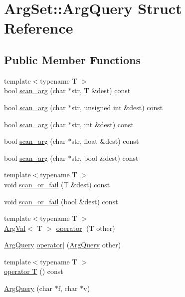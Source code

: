 \hypertarget{structArgSet_1_1ArgQuery}{\section{Arg\-Set\-:\-:Arg\-Query Struct Reference}
\label{structArgSet_1_1ArgQuery}
}
\subsection*{Public Member Functions}
\begin{DoxyCompactItemize}
\item 
{\footnotesize template$<$typename T $>$ }\\bool \hyperlink{structArgSet_1_1ArgQuery_ad1c8565789000799d89399357b3b7a8e}{scan\-\_\-arg} (char $\ast$str, T \&dest) const 
\item 
bool \hyperlink{structArgSet_1_1ArgQuery_acc5c6a294a3794ce1647fa540fde7af3}{scan\-\_\-arg} (char $\ast$str, unsigned int \&dest) const 
\item 
bool \hyperlink{structArgSet_1_1ArgQuery_aac1f8ec16ff67d1673b8a5bb6751d078}{scan\-\_\-arg} (char $\ast$str, int \&dest) const 
\item 
bool \hyperlink{structArgSet_1_1ArgQuery_a3235cfbd530a335ac3a0c0940623a185}{scan\-\_\-arg} (char $\ast$str, float \&dest) const 
\item 
bool \hyperlink{structArgSet_1_1ArgQuery_a26b2fad81bbc920f694522da48e903aa}{scan\-\_\-arg} (char $\ast$str, bool \&dest) const 
\item 
{\footnotesize template$<$typename T $>$ }\\void \hyperlink{structArgSet_1_1ArgQuery_a304f5268a939613e5616c6c8047c5eeb}{scan\-\_\-or\-\_\-fail} (T \&dest) const 
\item 
void \hyperlink{structArgSet_1_1ArgQuery_ac57ae0cc4fa9446ede3053bb3763b915}{scan\-\_\-or\-\_\-fail} (bool \&dest) const 
\item 
{\footnotesize template$<$typename T $>$ }\\\hyperlink{structArgSet_1_1ArgVal}{Arg\-Val}$<$ T $>$ \hyperlink{structArgSet_1_1ArgQuery_a5ea3053ffdda5d1c7f577847eb3a5d2c}{operator$|$} (T other)
\item 
\hyperlink{structArgSet_1_1ArgQuery}{Arg\-Query} \hyperlink{structArgSet_1_1ArgQuery_a5f4b8246c965de7c7bc844bf482a2814}{operator$|$} (\hyperlink{structArgSet_1_1ArgQuery}{Arg\-Query} other)
\item 
{\footnotesize template$<$typename T $>$ }\\\hyperlink{structArgSet_1_1ArgQuery_afb1df2fe767fdb68e4e526bb3349b790}{operator T} () const 
\item 
\hyperlink{structArgSet_1_1ArgQuery_a6409e2bf046c3e58a7d4b0e4f5064fef}{Arg\-Query} (char $\ast$f, char $\ast$v)
\end{DoxyCompactItemize}
